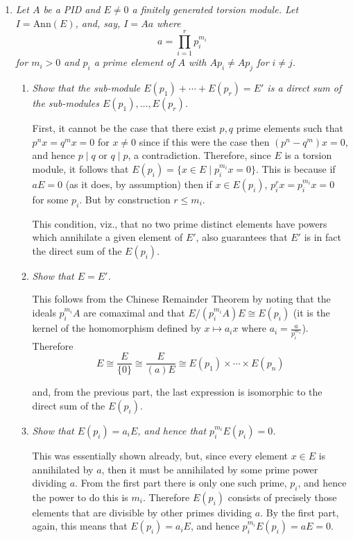 \documentclass[10pt]{article}
\newcommand{\Ann}{\text{Ann}}
\newcommand{\iso}{\cong}
\begin{document}
\begin{enumerate}
\begin{enumerate}
\end{enumerate}

\item \emph{Let $A$ be a PID and $E \neq 0$ a finitely generated torsion module.  Let $I = \Ann(E)$, and, say, $I = Aa$ where $$a = \prod_{i=1}^r p_i^{m_i}$$ for $m_i > 0$ and $p_i$ a prime element of $A$ with $Ap_i \neq Ap_j$ for $i \neq j$.}
\begin{enumerate}
\item \emph{Show that the sub-module $E(p_1) + \cdots + E(p_r) = E'$ is a direct sum of the sub-modules $E(p_1), \ldots, E(p_r)$.}

First, it cannot be the case that there exist $p,q$ prime elements such that $p^nx = q^mx = 0$ for $x \neq 0$ since if this were the case then $(p^n - q^m)x = 0$, and hence $p \mid q$ or $q \mid p$, a contradiction.  Therefore, since $E$ is a torsion module, it follows that $E(p_i) = \{x \in E \mid p_i^{m_i} x = 0 \}$.  This is because if $aE = 0$ (as it does, by assumption) then if $x \in E(p_i)$, $p_i^r x = p_i^{m_i} x = 0$ for some $p_i$.  But by construction $r \leq m_i$.

This condition, viz., that no two prime distinct elements have powers which annihilate a given element of $E'$, also guarantees that $E'$ is in fact the direct sum of the $E(p_i)$.
\item \emph{Show that $E = E'$.}

This follows from the Chinese Remainder Theorem by noting that the ideals $p_i^{m_i}A$ are comaximal and that $E/(p_i^{m_i}A)E \iso E(p_i)$ (it is the kernel of the homomorphism defined by $x \mapsto a_i x$ where $a_i = \frac{a}{p_i^{m_1}}$). Therefore
\[
E \iso \frac{E}{\{0\}} \iso \frac{E}{(a)E} \iso E(p_1) \times \cdots \times E(p_n)
\]

and, from the previous part, the last expression is isomorphic to the direct sum of the $E(p_i)$.

\item \emph{Show that $E(p_i) = a_iE$, and hence that $p_i^{m_i}E(p_i) = 0$.}

This was essentially shown already, but, since every element $x \in E$ is annihilated by $a$, then it must be annihilated by some prime power dividing $a$.  From the first part there is only one such prime, $p_i$, and hence the power to do this is $m_i$.  Therefore $E(p_i)$ consists of precisely those elements that are divisible by other primes dividing $a$.  By the first part, again, this means that $E(p_i) = a_iE$, and hence $p_i^{m_i}E(p_i) = aE = 0$.
\end{enumerate}


\end{enumerate}
\end{document}
